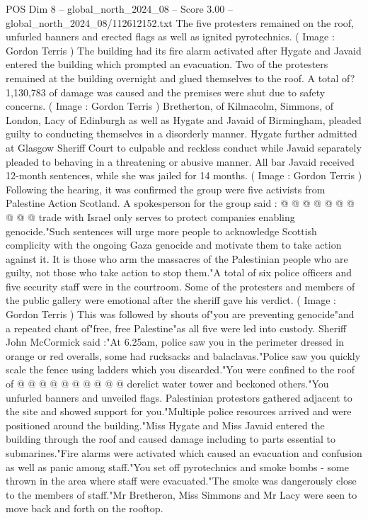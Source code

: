\begin{textsample}{POS Dim 8 – global\_north\_2024\_08 – Score 3.00 – global\_north\_2024\_08/112612152.txt}  \label{ex:f8_pos_329}
The five protesters remained on the roof, unfurled banners and erected flags as well as ignited pyrotechnics. ( Image : Gordon Terris ) The building had its fire alarm activated after Hygate and Javaid entered the building which prompted an evacuation.
Two of the protesters remained at the building overnight and glued themselves to the roof.
A total of? 1,130,783 of damage was caused and the premises were shut due to safety concerns. ( Image : Gordon Terris ) Bretherton, of Kilmacolm, Simmons, of London, Lacy of Edinburgh as well as Hygate and Javaid of Birmingham, pleaded guilty to conducting themselves in a disorderly manner.
Hygate further admitted at Glasgow Sheriff Court to culpable and reckless conduct while Javaid separately pleaded to behaving in a threatening or abusive manner.
All bar Javaid received 12-month sentences, while she was jailed for 14 months. ( Image : Gordon Terris ) Following the hearing, it was confirmed the group were five activists from Palestine Action Scotland.
A spokesperson for the group said : @ @ @ @ @ @ @ @ @ @ trade with Israel only serves to protect companies enabling genocide."Such sentences will urge more people to acknowledge Scottish complicity with the ongoing Gaza genocide and motivate them to take action against it.
It is those who arm the massacres of the Palestinian people who are guilty, not those who take action to stop them."A total of six police officers and five security staff were in the courtroom.
Some of the protesters and members of the public gallery were emotional after the sheriff gave his verdict. ( Image : Gordon Terris ) This was followed by shouts of"you are preventing genocide"and a repeated chant of"free, free Palestine"as all five were led into custody.
Sheriff John McCormick said :"At 6.25am, police saw you in the perimeter dressed in orange or red overalls, some had rucksacks and balaclavas."Police saw you quickly scale the fence using ladders which you discarded."You were confined to the roof of @ @ @ @ @ @ @ @ @ @ derelict water tower and beckoned others."You unfurled banners and unveiled flags.
Palestinian protestors gathered adjacent to the site and showed support for you."Multiple police resources arrived and were positioned around the building."Miss Hygate and Miss Javaid entered the building through the roof and caused damage including to parts essential to submarines."Fire alarms were activated which caused an evacuation and confusion as well as panic among staff."You set off pyrotechnics and smoke bombs - some thrown in the area where staff were evacuated."The smoke was dangerously close to the members of staff."Mr Bretheron, Miss Simmons and Mr Lacy were seen to move back and forth on the rooftop.

\end{textsample}
